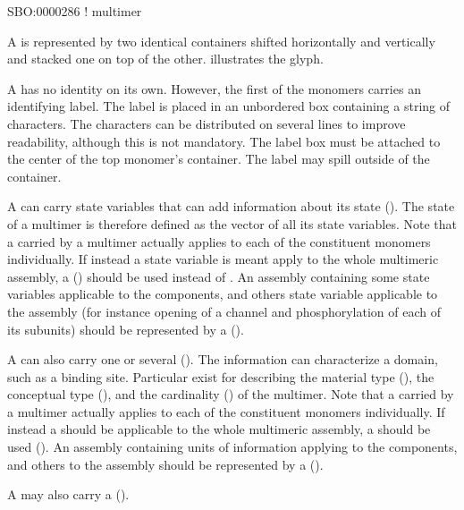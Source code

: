 \begin{glyphDescription}

\glyphSboTerm SBO:0000286 ! multimer

\glyphContainer A  is represented by two identical containers shifted horizontally and vertically and stacked one on top of the other.   illustrates the glyph.

\glyphLabel A  has no identity on its own.  However, the first of the monomers carries an identifying label.  The label is placed in an unbordered box containing a string of characters.  The characters can be distributed on several lines to improve readability, although this is not mandatory.  The label box must be attached to the center of the top monomer's container.  The label may spill outside of the container.

\glyphAux A  can carry state variables that can add information about its state ().  The state of a multimer is therefore defined as the vector of all its state variables.  Note that a  carried by a multimer actually applies to each of the constituent monomers individually.  If instead a state variable is meant apply to the whole multimeric assembly, a  () should be used instead of .  An assembly containing some state variables applicable to the components, and others state variable applicable to the assembly (for instance opening of a channel and phosphorylation of each of its subunits) should be represented by a  ().

A  can also carry one or several  ().  The information can characterize a domain, such as a binding site.  Particular  exist for describing the material type (), the conceptual type (), and the cardinality () of the multimer.  Note that a  carried by a multimer actually applies to each of the constituent monomers individually.  If instead a  should be applicable to the whole multimeric assembly, a  should be used (). An assembly containing units of information applying to the components, and others to the assembly should be represented by a  ().

A  may also carry a  ().

\end{glyphDescription}


